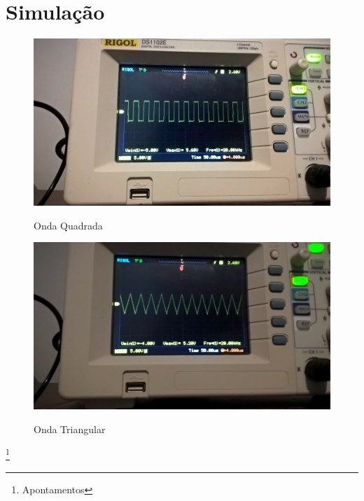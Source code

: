 \documentclass[titlepage, a4paper, 10pt, reqno, openany]{report}
\begin{document}
\section{Simulação}
\begin{figure}[H]
	\centering
	\includegraphics[scale=0.15]{./image/quadrado.jpg}\\
	\caption{Onda Quadrada}
\end{figure}
\begin{figure}[H]
	\centering
	\includegraphics[scale=0.15]{./image/triangulo.jpg}\\
	\caption{Onda Triangular}
\end{figure}\par
\newpage
\newpage
\footnote{Apontamentos}
%
	
\end{document}
